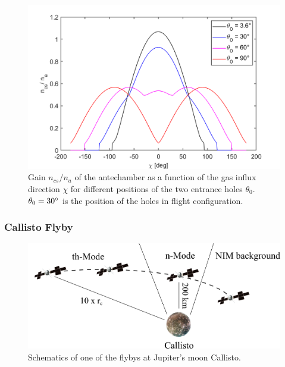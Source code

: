 		\begin{figure}[h!] %
			\centering
			\includegraphics[width= .8\textwidth]{Bilder/Chi_theta0.png}
			\caption{Gain $n_{cs}/n_a$ of the antechamber as a function of the gas influx direction $\chi$ for different positions of the two entrance holes $\theta_0$. $\theta_0=30^\circ$ is the position of the holes in flight configuration.}
			\label{th:densEnhChiTheta}
		\end{figure}
		
		\subsubsection{Callisto Flyby}\label{subsubsec:Calfly}
	
		\begin{figure}[h!]
			\centering
			\includegraphics[width=.8\textwidth]{Bilder/Callisto_flyby_schematic.png}
			\caption{Schematics of one of the flybys at Jupiter's moon Callisto.}
			\label{fig:CalflybySchem}
		\end{figure}
				
